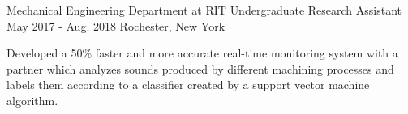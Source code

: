 \begin{cventries}


\cventry
{Mechanical Engineering Department at RIT} %
{Undergraduate Research Assistant} %
{May 2017 - Aug. 2018} %
{Rochester, New York} %
{ %
\vspace{0.5mm}
\begin{cvitems}
\item {Developed a 50\% faster and more accurate real-time monitoring system with a partner which analyzes sounds produced by different machining processes and labels them according to a classifier created by a support vector machine algorithm.}
\end{cvitems}
}

\end{cventries}